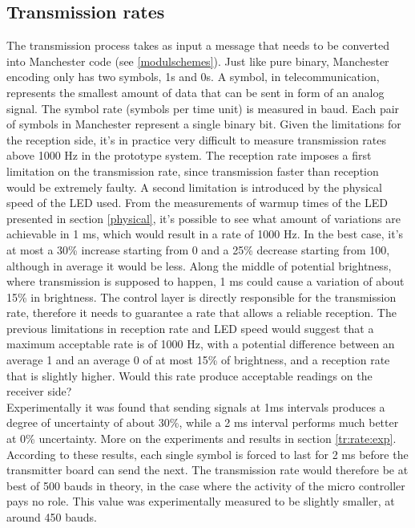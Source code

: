 \subsection{Transmission rates}
The transmission process takes as input a message that needs to be converted into Manchester code (see \ref{modulschemes}).
Just like pure binary, Manchester encoding only has two symbols, 1s and 0s.
A symbol, in telecommunication, represents the smallest amount of data that can be sent in form of an analog signal. The symbol rate (symbols per time unit) is measured in baud.
Each pair of symbols in Manchester represent a single binary bit. 
Given the limitations for the reception side, it's in practice very difficult to measure transmission rates above 1000 Hz in the prototype system.
The reception rate imposes a first limitation on the transmission rate, since transmission faster than reception would be extremely faulty.
A second limitation is introduced by the physical speed of the LED used.
From the measurements of warmup times of the LED presented in section \ref{physical}, it's possible to see what amount of variations are achievable in 1 ms, which would result in a rate of 1000 Hz.
In the best case, it's at most a 30\% increase starting from 0 and a 25\% decrease starting from 100, although in average it would be less.
Along the middle of potential brightness, where transmission is supposed to happen, 1 ms could cause a variation of about 15\% in brightness.
The control layer is directly responsible for the transmission rate, therefore it needs to guarantee a rate that allows a reliable reception.
The previous limitations in reception rate and LED speed would suggest that a maximum acceptable rate is of 1000 Hz, with a potential difference between an average 1 and an average 0 of at most 15\% of brightness, and a reception rate that is slightly higher.
Would this rate produce acceptable readings on the receiver side?\\
Experimentally it was found that sending signals at 1ms intervals produces a degree of uncertainty of about 30\%, while a 2 ms interval performs much better at 0\% uncertainty.
More on the experiments and results in section \ref{tr:rate:exp}.
According to these results, each single symbol is forced to last for 2 ms before the transmitter board can send the next.
The transmission rate would therefore be at best of 500 bauds in theory, in the case where the activity of the micro controller pays no role.
This value was experimentally measured to be slightly smaller, at around 450 bauds. 

